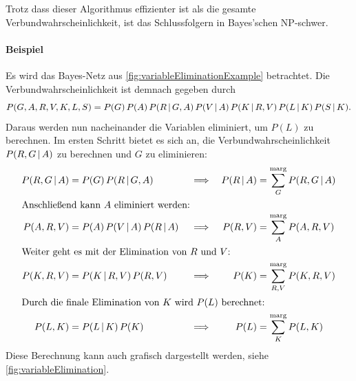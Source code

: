 			Trotz dass dieser Algorithmus effizienter ist als die gesamte Verbundwahrscheinlichkeit, ist das Schlussfolgern in Bayes'schen NP-schwer.

			\paragraph{Beispiel}
				Es wird das Bayes-Netz aus \autoref{fig:variableEliminationExample} betrachtet. Die Verbundwahrscheinlichkeit ist demnach gegeben durch
				\begin{equation}
					P(G, A, R, V, K, L, S) = P(G) \, P(A) \, P(R \,\vert\, G, A) \, P(V \,\vert\, A) \, P(K \,\vert\, R, V) \, P(L \,\vert\, K) \, P(S \,\vert\, K).
				\end{equation}
				Daraus werden nun nacheinander die Variablen eliminiert, um \( P(L) \) zu berechnen. Im ersten Schritt bietet es sich an, die Verbundwahrscheinlichkeit \( P(R, G \,\vert\, A) \) zu berechnen und \(G\) zu eliminieren:
				\begin{align}
						P(R, G \,\vert\, A) &= P(G) \, P(R \,\vert\, G, A) &
						&\implies&
						P(R \,\vert\, A) &= \sum_{G}^{\text{marg}} P(R, G \,\vert\, A) \\
					\intertext{Anschließend kann \(A\) eliminiert werden:}
						P(A, R, V) &= P(A) \, P(V \,\vert\, A) \, P(R \,\vert\, A) &
						&\implies&
						P(R, V) &= \sum_{A}^{\text{marg}} P(A, R, V) \\
					\intertext{Weiter geht es mit der Elimination von \(R\) und \(V\):}
						P(K, R, V) &= P(K \,\vert\, R, V) \, P(R, V) &
						&\implies&
						P(K) &= \sum_{R, V}^{\text{marg}} P(K, R, V) \\
					\intertext{Durch die finale Elimination von \(K\) wird \(P(L)\) berechnet:}
						P(L, K) &= P(L \,\vert\, K) \, P(K) &
						&\implies&
						P(L) &= \sum_{K}^{\text{marg}} P(L, K)
				\end{align}
				Diese Berechnung kann auch grafisch dargestellt werden, siehe \autoref{fig:variableElimination}.


